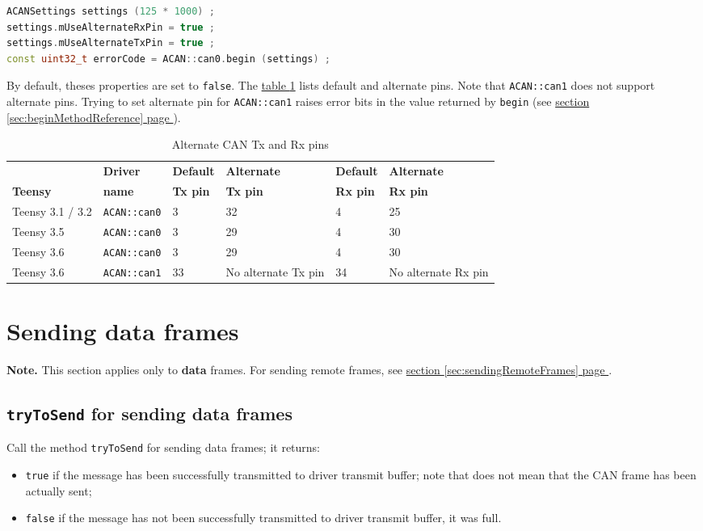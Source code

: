 \documentclass[10pt, a4paper, obeyspaces, openany]{extarticle}
\newcommand \sectionLabel[2]{\section{#1}\label{sec:#2}}
\newcommand\refSectionPage[1]{\hyperref[sec:#1]{section \ref*{sec:#1} page \pageref{sec:#1}}}
\newcommand\labelTableau[1]{\label{tab:#1}}
\newcommand\refTableau[1]{\hyperref[tab:#1]{table \ref*{tab:#1}}}
\begin{document}
{ \small\begin{lstlisting}[language=c++]
ACANSettings settings (125 * 1000) ;
settings.mUseAlternateRxPin = true ;
settings.mUseAlternateTxPin = true ;
const uint32_t errorCode = ACAN::can0.begin (settings) ;
\end{lstlisting}}

By default, theses properties are set to \texttt{false}. The \refTableau{alternatePins} lists default and alternate pins. Note that \texttt{ACAN::can1} does not support alternate pins. Trying to set alternate pin for \texttt{ACAN::can1} raises error bits in the value returned by \texttt{begin} (see \refSectionPage{beginMethodReference}). 

\begin{table}[!ht]
  \small
  \onehalfspacing
  \centering
  \begin{tabular}{llllll}
                   &  \textbf{Driver}  &  \textbf{Default} & \textbf{Alternate} & \textbf{Default} & \textbf{Alternate}\\
    \textbf{Teensy}& \textbf{name} & \textbf{Tx pin} & \textbf{Tx pin} & \textbf{ Rx pin} & \textbf{ Rx pin}\\
    Teensy 3.1 / 3.2 & \texttt{ACAN::can0}      & 3        & 32      & 4 & 25\\
    Teensy 3.5 &  \texttt{ACAN::can0}           & 3        & 29      & 4 & 30\\
    Teensy 3.6 &  \texttt{ACAN::can0}           & 3        & 29      & 4 & 30 \\
    Teensy 3.6 &  \texttt{ACAN::can1}           & 33 & No alternate Tx pin & 34 & No alternate Rx pin\\
  \end{tabular}
  \caption{Alternate CAN Tx and Rx pins}
  \labelTableau{alternatePins}
\end{table}


\sectionLabel{Sending data frames}{sendingDataFrames}

{\bf Note. } This section applies only to {\bf data} frames. For sending remote frames, see \refSectionPage{sendingRemoteFrames}.

\subsection{\texttt{tryToSend} for sending data frames}
Call the method \texttt{tryToSend} for sending data frames; it returns:
\begin{itemize}
  \item \texttt{true} if the message has been successfully transmitted to driver transmit buffer; note that does not mean that the CAN frame has been actually sent;
  \item \texttt{false} if the message has not been successfully transmitted to driver transmit buffer, it was full.
\end{itemize}
\end{document}
